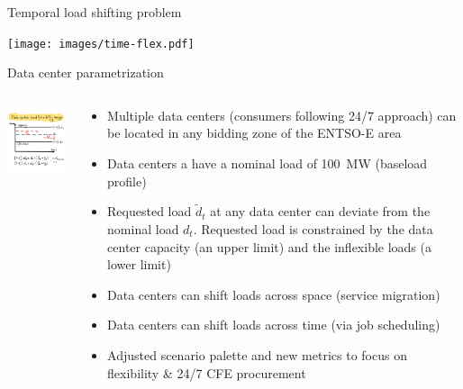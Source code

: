 \begin{frame}{Temporal load shifting problem}

  \centering
  \texttt{[image: images/time-flex.pdf]}
  
\end{frame}


\begin{frame}{Data center parametrization}

  \begin{columns}[T]
  \begin{column}{5cm}

  \centering
  \vspace{0.3cm}
  \includegraphics[width=5cm]{images/load_flex.png}

  \vspace{0.1cm}
  {\scriptsize
   
  }
  \end{column}

  \begin{column}{10cm}
  {\small
  \begin{itemize}

  \item \alert{Multiple data centers} (consumers following 24/7 approach) can be located 
        in any bidding zone of the ENTSO-E area

  \item Data centers a have a nominal load of \alert{100~MW} (baseload profile)

  \item Requested load $\widetilde{d}_t$ at any data center can deviate from the nominal load $d_t$. 
        Requested load is constrained by the \alert{data center capacity} 
        (an upper limit) and the \alert{inflexible loads} (a lower limit)
  
  \item Data centers can \alert{shift loads across space} (service migration)
  
  \item Data centers can \alert{shift loads across time} (via job scheduling)

  \item Adjusted scenario palette and new metrics to focus on flexibility \& 24/7 CFE procurement
  
  \end{itemize}
  }

  \end{column}
  \end{columns}

\end{frame}

